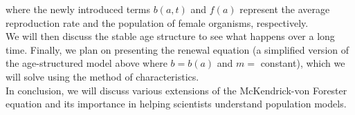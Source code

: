 where the newly introduced terms $b(a, t)$ and $f(a)$ represent the average reproduction rate and the population of female organisms, respectively. \\

We will then discuss the stable age structure to see what happens over a long time. Finally, we plan on presenting the renewal equation (a simplified version of the age-structured model above where $b = b(a)$ and $m =$ constant), which we will solve using the method of characteristics. \\

In conclusion, we will discuss various extensions of the McKendrick-von Forester equation and its importance in helping scientists understand population models. 

